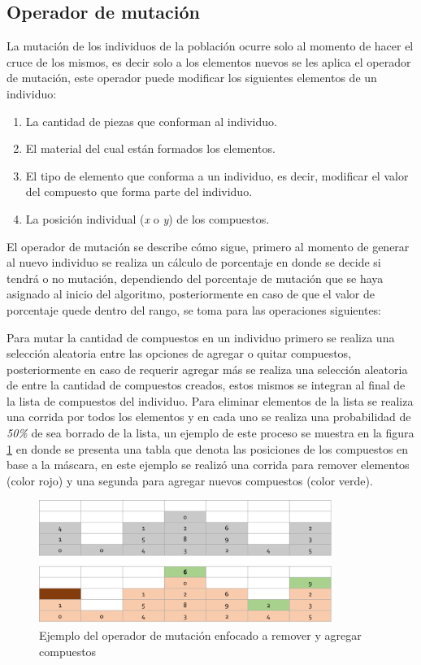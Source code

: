 \subsection{Operador de mutación}
\label{subsection:mutation_operator}

La mutación de los individuos de la población ocurre solo al momento de hacer el
cruce de los mismos, es decir solo a los elementos nuevos se les aplica el
operador de mutación, este operador puede modificar los siguientes elementos de
un individuo:

\begin{enumerate}
  \item La cantidad de piezas que conforman al individuo.
  \item El material del cual están formados los elementos.
  \item El tipo de elemento que conforma a un individuo, es decir, modificar el
  valor del compuesto que forma parte del individuo.
  \item La posición individual (\textit{x} o \textit{y}) de los compuestos.
\end{enumerate}

El operador de mutación se describe cómo sigue,
primero al momento de generar al nuevo individuo se realiza un cálculo de
porcentaje en donde se decide si tendrá o no mutación, dependiendo del porcentaje
de mutación que se haya asignado al inicio del algoritmo, posteriormente en caso
de que el valor de porcentaje quede dentro del rango, se toma para las
operaciones siguientes:

Para mutar la cantidad de compuestos en un individuo primero se realiza una
selección aleatoria entre las opciones de agregar o quitar compuestos,
posteriormente en caso de requerir agregar más se realiza una selección
aleatoria de entre la cantidad de compuestos creados, estos mismos se integran
al final de la lista de compuestos del individuo. Para eliminar elementos de la
lista se realiza una corrida por todos los elementos y en cada uno se realiza
una probabilidad de \textit{50\%} de sea borrado de la lista, un ejemplo de este
proceso se muestra en la figura \ref{figure:mutate_add_remove} en donde se
presenta una tabla que denota las posiciones de los compuestos en base a la
máscara, en este ejemplo se realizó una corrida para remover elementos (color
rojo) y una segunda para agregar nuevos compuestos (color verde).

\begin{figure}
  \centering
  \includegraphics[width=0.85\textwidth]{img/mutation_add_remove.png}
  \caption{Ejemplo del operador de mutación enfocado a remover y agregar compuestos}
  \label{figure:mutate_add_remove}
\end{figure}

